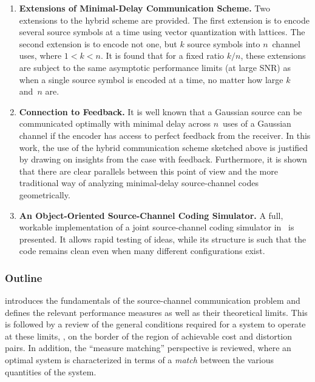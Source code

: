 \begin{enumerate}
  \item \textbf{Extensions of Minimal-Delay Communication Scheme.} Two
    extensions to the hybrid scheme are provided. The first extension is to
    encode several source symbols at a time using vector quantization with
    lattices. The second extension is to encode not one, but $k$ source symbols
    into $n$~channel uses, where $1 < k < n$. It is found that for a fixed ratio
    $k/n$, these extensions are subject to the same asymptotic performance
    limits (at large SNR) as when a single source symbol is encoded at a time,
    no matter how large $k$ and~$n$ are.

  \item \textbf{Connection to Feedback.} It is well known that a Gaussian source
    can be communicated optimally with minimal delay across $n$~uses of a
    Gaussian channel if the encoder has access to perfect feedback from the
    receiver. In this work,  the use of the hybrid communication scheme sketched
    above is justified by drawing on insights from the case with feedback.
    Furthermore, it is shown that there are clear parallels between this point
    of view and the more traditional way of analyzing minimal-delay
    source-channel codes geometrically. 

  \item \textbf{An Object-Oriented Source-Channel Coding Simulator.} A full,
    workable implementation of a joint source-channel coding simulator in
    \matlab\ is presented. It allows rapid testing of ideas, while its structure
    is such that the code remains clean even when many different configurations
    exist. 

\end{enumerate}


\subsubsection{Outline}

 introduces the fundamentals of the source-channel
communication problem and defines the relevant performance measures as well as
their theoretical limits.  This is followed by a review of the general
conditions required for a system to operate at these limits, \ie, on the border
of the region of achievable cost and distortion pairs. In addition, the
``measure matching'' perspective is reviewed, where an optimal system is
characterized in terms of a  \emph{match} between the various quantities of the
system.

